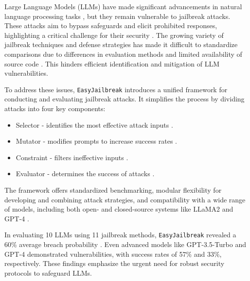 \documentclass[18pt]{article}
\begin{document}
		Large Language Models (LLMs) have made significant advancements in natural language processing tasks \cite{achiam2023gpt, touvron2023llama, bai2023qwen}, but they remain vulnerable to jailbreak attacks. These attacks aim to bypass safeguards and elicit prohibited responses, highlighting a critical challenge for their security \cite{jailbroken, yao2023fuzzllm}. The growing variety of jailbreak techniques and defense strategies has made it difficult to standardize comparisons due to differences in evaluation methods and limited availability of source code \cite{jailbreak_survey, DeepInception}. This hinders efficient identification and mitigation of LLM vulnerabilities.
		
		\noindent To address these issues, \texttt{EasyJailbreak} introduces a unified framework for conducting and evaluating jailbreak attacks. It simplifies the process by dividing attacks into four key components:
		
		\begin{itemize}
			\item Selector - identifies the most effective attack inputs \cite{yao2023fuzzllm, tap}.
			\item Mutator - modifies prompts to increase success rates \cite{gcg, autodanliu2023}.
			\item Constraint - filters ineffective inputs \cite{gptfuzz, tap}.
			\item Evaluator - determines the success of attacks \cite{pair, yao2023fuzzllm}.
		\end{itemize}
		
		\noindent The framework offers standardized benchmarking, modular flexibility for developing and combining attack strategies, and compatibility with a wide range of models, including both open- and closed-source systems like LLaMA2 \cite{touvron2023llama} and GPT-4 \cite{achiam2023gpt}.
		
		\noindent In evaluating 10 LLMs using 11 jailbreak methods, \texttt{EasyJailbreak} revealed a 60\% average breach probability \cite{jailbroken, yao2023fuzzllm}. Even advanced models like GPT-3.5-Turbo and GPT-4 demonstrated vulnerabilities, with success rates of 57\% and 33\%, respectively. These findings emphasize the urgent need for robust security protocols to safeguard LLMs.
		
	
	\newpage
\end{document}
